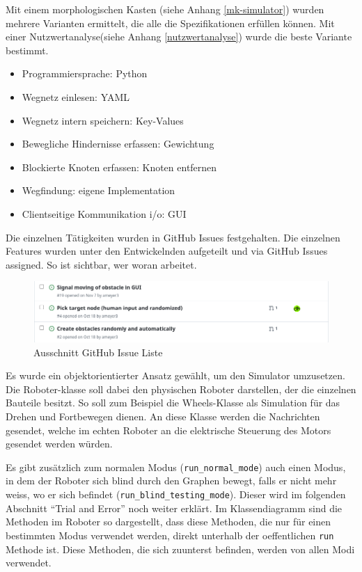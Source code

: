Mit einem morphologischen Kasten (siehe Anhang \ref{mk-simulator}) wurden mehrere Varianten ermittelt, die alle die Spezifikationen erfüllen können. Mit einer Nutzwertanalyse(siehe Anhang \ref{nutzwertanalyse}) wurde die beste Variante bestimmt.

\begin{itemize}
    \item Programmiersprache: Python
    \item Wegnetz einlesen: YAML
    \item Wegnetz intern speichern: Key-Values
    \item Bewegliche Hindernisse erfassen: Gewichtung
    \item Blockierte Knoten erfassen: Knoten entfernen
    \item Wegfindung: eigene Implementation
    \item Clientseitige Kommunikation \acrshort{i/o}: GUI
\end{itemize}

Die einzelnen Tätigkeiten wurden in GitHub Issues festgehalten. Die einzelnen Features wurden unter den Entwickelnden aufgeteilt und via GitHub Issues assigned. So ist sichtbar, wer woran arbeitet.

\begin{figure}[H]
\centering
\includegraphics[width=\textwidth]{img/github-issues.png}
\caption{Ausschnitt GitHub Issue Liste}
\label{fig:github-issues}
\end{figure}

Es wurde ein objektorientierter Ansatz gewählt, um den Simulator umzusetzen. Die Roboter-klasse soll dabei den physischen Roboter darstellen, der die einzelnen Bauteile besitzt. So soll zum Beispiel die Wheels-Klasse als Simulation für das Drehen und Fortbewegen dienen. An diese Klasse werden die Nachrichten gesendet, welche im echten Roboter an die elektrische Steuerung des Motors gesendet werden würden.

Es gibt zusätzlich zum normalen Modus (\verb|run_normal_mode|) auch einen Modus, in dem der Roboter sich blind durch den Graphen bewegt, falls er nicht mehr weiss, wo er sich befindet (\verb|run_blind_testing_mode|). Dieser wird im folgenden Abschnitt ``Trial and Error'' noch weiter erklärt. Im Klassendiagramm sind die Methoden im Roboter so dargestellt, dass diese Methoden, die nur für einen bestimmten Modus verwendet werden, direkt unterhalb der oeffentlichen \verb|run| Methode ist. Diese Methoden, die sich zuunterst befinden, werden von allen Modi verwendet. 

